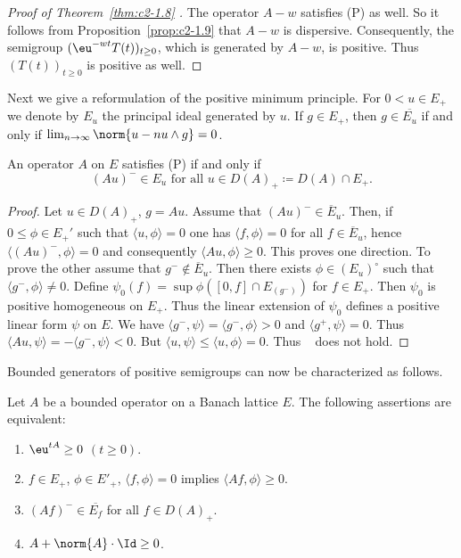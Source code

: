 \begin{proof}[Proof of Theorem~\ref{thm:c2-1.8}  ]
%
The operator $A - w$ satisfies (P) 
as well.
So it follows from Proposition~\ref{prop:c2-1.9}   that $A - w$ is dispersive.
Consequently, the semigroup $(\eu^{-wt}T(t))_{t \geq 0}$, which is generated by $A - w$, is positive.
Thus $(T(t))_{t \geq 0}$ is positive as well.
\end{proof}
Next we give a reformulation of the positive minimum principle.
For $0 < u \in E_{+}$ we denote by $E_{u}$ the principal ideal generated by $u$.
If\/ $g \in E_{+}$, then $g \in \overline{E_{u}}$ if and only if\/ $\lim_{n \to \infty} \norm{u - n u \wedge g} = 0$.
\begin{lemma}\label{lem:c2-1.10}
%
An operator $A$ on $E$ satisfies (P) if and only if
\begin{equation}\label{eq:c2-1.8}
(Au)^{-} \in E_{u} \text{ for all } u \in D(A)_{+} \coloneqq D(A) \cap E_{+}.
\end{equation}
\end{lemma}
\begin{proof}
Let $u \in D(A)_{+}$, $g = Au$.
Assume that $(Au)^{-} \in \overline{E}_{u}$.
Then, if\/ $0 \leq \phi \in E_{+}'$ such that $\langle u,\phi \rangle = 0$ one has $\langle f,\phi \rangle = 0$ for all $f \in \overline{E}_{u}$, hence $\langle (Au)^{-},\phi \rangle = 0$ and consequently $\langle Au,\phi \rangle \geq 0$.
This proves one direction.
To prove the other assume that $g^{-} \not\in \overline{E}_{u}$.
Then there exists $\phi \in (E_{u})^{\circ}$ such that $\langle g^{-},\phi \rangle \not= 0$.
Define $\psi_{0}(f) = \sup \phi([0,f] \cap E_{(g^{-})})$ for $f \in E_{+}$.
Then $\psi_{0}$ is positive homogeneous on $E_{+}$.
Thus the linear extension of\/ $\psi_{0}$ defines a positive linear form $\psi$ on $E$.
We have $\langle g^{-},\psi \rangle = \langle g^{-},\phi \rangle > 0$ and $\langle g^{+},\psi \rangle = 0$.
Thus $\langle Au,\psi \rangle = - \langle g^{-},\psi \rangle < 0$.
But $\langle u,\psi \rangle \leq \langle u,\phi \rangle = 0$.
Thus  ~   does not hold.
\end{proof}
Bounded generators of positive semigroups can now be characterized as follows.
\begin{theorem}\label{thm:c2-1.11}
%
Let $A$ be a bounded operator on a Banach lattice $E$.
The following assertions are equivalent:
\begin{enumerate}[\upshape (a)] 
\item \label{thm:c2-1.11-1}
$\eu^{tA} \geq 0$ $(t \geq 0)$.
\item \label{thm:c2-1.11-2}
$f \in E_{+}$, $\phi \in E'_{+}$, $\langle f,\phi \rangle = 0$ implies $\langle Af,\phi \rangle \geq 0$.
\item \label{thm:c2-1.11-3}
$(Af)^{-} \in \overline{E_{f}}$ for all $f \in D(A)_{+}$.
\item \label{thm:c2-1.11-4}
$A + \norm{A} \cdot \Id \geq 0$.
\end{enumerate}
\end{theorem}
